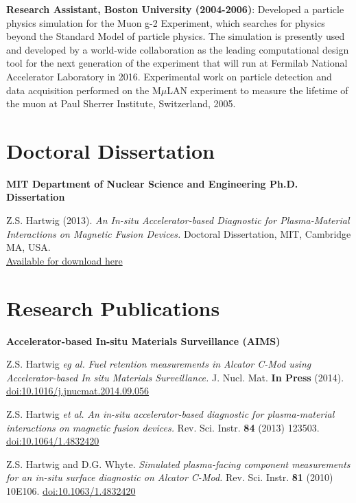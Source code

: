 \documentclass[10pt]{article}
\begin{document}
\begin{innerlist}
\item \textbf{Research Assistant, Boston University (2004-2006)}:
  Developed a particle physics simulation for the Muon g-2 Experiment,
  which searches for physics beyond the Standard Model of particle
  physics. The simulation is presently used and developed by a
  world-wide collaboration as the leading computational design tool
  for the next generation of the experiment that will run at Fermilab
  National Accelerator Laboratory in 2016. Experimental work on
  particle detection and data acquisition performed on the M$\mu$LAN
  experiment to measure the lifetime of the muon at Paul Sherrer
  Institute, Switzerland, 2005.
\end{innerlist}

\newpage
{}

\section{Doctoral Dissertation}
\textbf{MIT Department of Nuclear Science and Engineering Ph.D. Dissertation}
\begin{innerlist}
\item Z.S. Hartwig (2013). \textit{An In-situ Accelerator-based Diagnostic
  for Plasma-Material Interactions on Magnetic Fusion Devices.}
Doctoral Dissertation, MIT, Cambridge MA,
USA.\\ \href{http://www.psfc.mit.edu/library1/catalog/restricted/rr_reports/13rr012/13rr012_full.pdf}{Available
  for download here}
\end{innerlist}

\section{Research Publications}
\textbf{Accelerator-based In-situ Materials Surveillance (AIMS)}
\begin{innerlist}

\item Z.S. Hartwig \textit{eg al.} \textit{Fuel retention measurements
  in Alcator C-Mod using Accelerator-based In situ Materials
  Surveillance.} J. Nucl. Mat. \textbf{In Press} (2014).
  \href{http://dx.doi.org/10.1016/j.jnucmat.2014.09.056}{doi:10.1016/j.jnucmat.2014.09.056}
  \vspace{0.2cm}

\item Z.S. Hartwig \textit{et al.} \textit{An in-situ
  accelerator-based diagnostic for plasma-material interactions on
  magnetic fusion devices.} Rev. Sci. Instr. \textbf{84} (2013)
  123503.
  \href{http://dx.doi.org/10.1063/1.4832420}{doi:10.1064/1.4832420}
  \vspace{0.2cm}

\item Z.S. Hartwig and D.G. Whyte. \textit{Simulated plasma-facing
  component measurements for an in-situ surface diagnostic on Alcator
  C-Mod.} Rev. Sci. Instr. \textbf{81} (2010)
  10E106.
  \href{http://dx.doi.org/10.1063/1.3478634}{doi:10.1063/1.4832420}
\end{innerlist}
\end{document}
